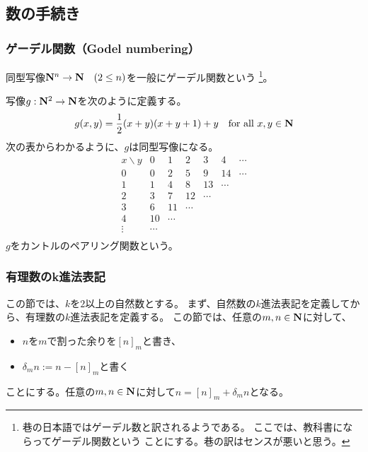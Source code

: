 \subsection{数の手続き}\label{s2:数の手続き} %
\subsubsection{ゲーデル関数（Godel numbering）}\label{s3:ゲーデル関数} %
	\begin{definition}[ゲーデル関数]\label{def:ゲーデル関数} %
		同型写像$\mathbf{N}^n\to\mathbf{N} \quad(2\le n)$を一般にゲーデル関数という
		\footnote{
			巷の日本語ではゲーデル数と訳されるようである。
			ここでは、教科書\cite{takahashi:keisan}にならってゲーデル関数という
			ことにする。巷の訳はセンスが悪いと思う。
		}。
	\end{definition} %

	\begin{example}[カントルのペアリング関数]
	\label{eg:カントルのペアリング関数} %
		写像$g:\mathbf{N}^2\to\mathbf{N}$を次のように定義する。
		\begin{equation*}\begin{split}
			g(x, y) = \frac{1}{2}(x+y)(x+y+1) + y
			\quad\text{for all }x,y\in\mathbf{N}
		\end{split}\end{equation*}
		次の表からわかるように、$g$は同型写像になる。
		\begin{equation*}\begin{array}{c|cccccc}
			x\backslash y & 0 & 1 & 2 & 3 & 4 & \cdots \\ \hline
			0 & 0 & 2 & 5 & 9 & 14 & \cdots \\
			1 & 1 & 4 & 8 & 13 & \cdots \\
			2 & 3 & 7 & 12 & \cdots \\
			3 & 6 & 11 & \cdots \\
			4 & 10 & \cdots \\
			\vdots & \cdots \\
		\end{array}\end{equation*}
		$g$をカントルのペアリング関数という。
	\end{example} %
\subsubsection{有理数のk進法表記}\label{s3:有理数のk進法表記} %
	この節では、$k$を$2$以上の自然数とする。
	まず、自然数の$k$進法表記を定義してから、有理数の$k$進法表記を定義する。
	この節では、任意の$m,n\in\mathbf{N}$に対して、
	\begin{itemize}\setlength{\itemsep}{-1mm} %
		\item $n$を$m$で割った余りを$[n]_m$と書き、
		\item $\delta_mn:=n-[n]_m$と書く
	\end{itemize} %
	ことにする。任意の$m,n\in\mathbf{N}$に対して$n = [n]_m + \delta_mn$となる。

